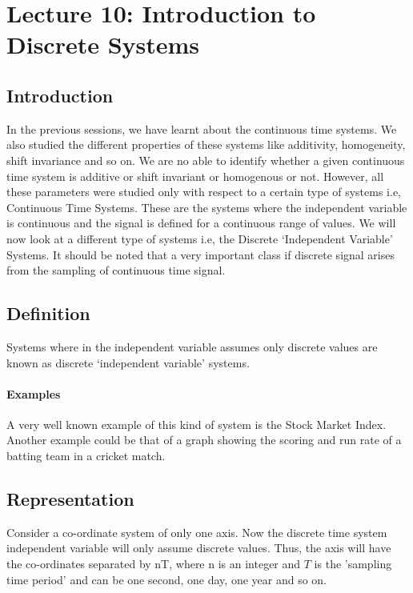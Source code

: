 \section{Lecture 10: Introduction to Discrete Systems}



\subsection{Introduction}

In the previous sessions, we have learnt about the continuous time systems. We also studied the different properties of these systems like additivity, homogeneity, shift invariance and so on.
We are no able to identify whether a given continuous time system is additive or shift invariant or homogenous or not. 
However, all these parameters were studied only with respect to a certain type of systems i.e, Continuous Time Systems. These are the systems where the independent variable is continuous and the signal is defined for a continuous range of values.
We will now look at a different type of systems i.e, the Discrete ‘Independent Variable’ Systems.
It should be noted that a very important class if discrete signal arises from the sampling of continuous time signal.


\subsection{Definition}
 Systems where in the independent variable assumes only discrete values are known as discrete ‘independent variable’ systems. 

\paragraph{Examples}

A very well known example of this kind of system is the Stock Market Index. 
Another example could be that of a graph showing the scoring and run rate of a batting team in a cricket match.
\subsection{Representation}


Consider a co-ordinate system of only one axis. Now the discrete time system independent variable will only assume discrete values. Thus, the axis will have the co-ordinates separated by nT, where n is an integer and $T$ is the 'sampling time period' and can be  one second, one day, one year and so on. 

